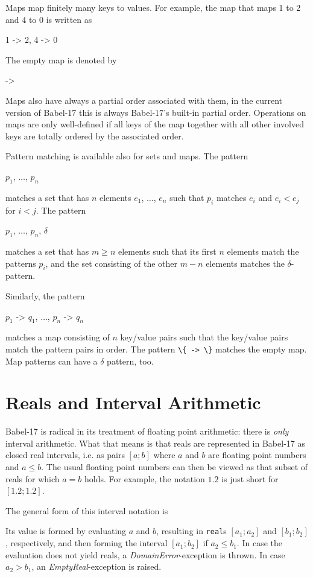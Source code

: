 \documentclass[11pt]{amsart}
\newcommand{\babelsrc}[1] {\lstinline!#1!}
\begin{document}
Maps map finitely many keys to values. For example, the map that maps 1 to 2 and 4 to 0 is written as
\begin{babellisting}
{1 -> 2, 4 -> 0}
\end{babellisting}
The empty map is denoted by 
\begin{babellisting}
{->}
\end{babellisting}
Maps also have always a partial order associated with them, in the current version of Babel-17 this is always Babel-17's built-in partial order.  Operations on maps are only well-defined if all keys of the map together with all other involved keys are totally ordered by the associated order. 

Pattern matching is available also for sets and maps. The pattern 
\begin{babellisting}
{$p_1$, $\ldots$, $p_n$}
\end{babellisting}
matches a set that has $n$ elements $e_1$, $\ldots$, $e_n$ such that $p_i$ matches $e_i$ and $e_i < e_j$ for $i < j$. The pattern
\begin{babellisting}
{$p_1$, $\ldots$, $p_n$, $\delta$}
\end{babellisting}
matches a set that has $m \ge n$ elements such that its first $n$ elements match the patterns $p_i$, and the set consisting of the other $m-n$ elements matches the $\delta$-pattern. 

Similarly, the pattern
\begin{babellisting}
{$p_1$ -> $q_1$, $\ldots$, $p_n$ -> $q_n$}
\end{babellisting}
matches a map consisting of $n$ key/value pairs such that the key/value pairs match the pattern pairs in order.
The pattern \babelsrc{\{ -> \}} matches the empty map. Map patterns can have a $\delta$ pattern, too.

\section{Reals and Interval Arithmetic}\label{sec:reals}
Babel-17 is radical in its treatment of floating point arithmetic: there is \emph{only} interval arithmetic. What that means is that reals are represented in Babel-17 as closed real intervals, i.e. as pairs $[a; b]$ where $a$ and $b$ are floating point numbers and $a \leq b$. The usual floating point numbers can then be viewed as that subset of reals for which $a = b$ holds. For example, the notation $1.2$ is just short for $[1.2; 1.2]$.

The general form of this interval notation is
\begin{babellisting}
[$a$; $b$]
\end{babellisting}
Its value is formed by evaluating $a$ and $b$, resulting in \texttt{real}s $[a_1; a_2]$ and $[b_1; b_2]$, respectively, and then forming the interval $[a_1; b_2]$ if $a_2 \leq b_1$. In case the evaluation does not yield reals, a \emph{DomainError}-exception is thrown. In case $a_2 > b_1$, an \emph{EmptyReal}-exception is raised.
\end{document}
